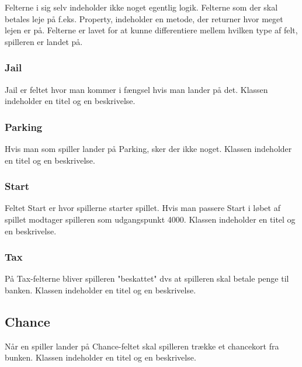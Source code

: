 Felterne i sig selv indeholder ikke noget egentlig logik. Felterne som der skal betales leje på f.eks. Property, indeholder en metode, der returner hvor meget lejen er på. Felterne er lavet for at kunne differentiere mellem hvilken type af felt, spilleren er landet på.

\subsubsection{Jail}
Jail er feltet hvor man kommer i fængsel hvis man lander på det. Klassen indeholder en titel og en beskrivelse.

\subsubsection{Parking}
Hvis man som spiller lander på Parking, sker der ikke noget. Klassen indeholder en titel og en beskrivelse.

\subsubsection{Start}
Feltet Start er hvor spillerne starter spillet. Hvis man passere Start i løbet af spillet modtager spilleren som udgangspunkt 4000. Klassen indeholder en titel og en beskrivelse.

\subsubsection{Tax}
På Tax-felterne bliver spilleren "beskattet" dvs at spilleren skal betale penge til banken. Klassen indeholder en titel og en beskrivelse.

\subsection{Chance}
Når en spiller lander på Chance-feltet skal spilleren trække et chancekort fra bunken. Klassen indeholder en titel og en beskrivelse.


